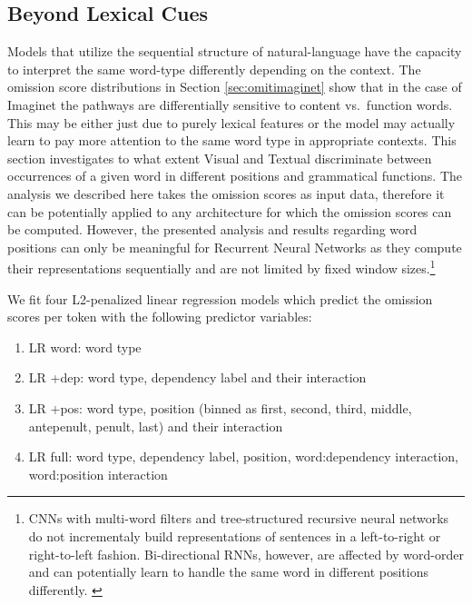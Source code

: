 

\subsection{Beyond Lexical Cues}
\label{sec:beyondlexical}

Models that utilize the sequential structure of natural-language 
have the capacity to interpret the same word-type differently depending on
the context. The omission score distributions in Section \ref{sec:omitimaginet} 
show that in the case of {\sc Imaginet} the 
pathways are differentially sensitive to content vs.\ function
words. This may be either just due to purely lexical features or the model 
may actually learn to pay more attention to the same word type in appropriate
contexts. This section investigates to what extent {\sc Visual} and {\sc Textual}
discriminate between occurrences of a given word in different positions and 
grammatical functions. The analysis we described here takes \label{edit:beyonlexicalgeneral}
the omission scores as input data, therefore it can be potentially applied 
to any architecture for which the omission scores can be computed. However,
the presented analysis and results regarding word positions can only be meaningful
for Recurrent Neural Networks as they compute their representations sequentially and are not
limited by fixed window sizes.\footnote{CNNs with multi-word filters
and tree-structured recursive neural networks do not incrementaly build representations
of sentences in a left-to-right or right-to-left fashion. 
Bi-directional RNNs, however, are affected by word-order and can potentially
learn to handle the same word in different positions differently. \label{edit:foot}}

We fit four L2-penalized linear regression models which predict the omission 
scores per token with the following predictor variables: 


\begin{enumerate}
	\item {\sc LR word}: word type
	\item {\sc LR +dep}: word type, dependency label and their interaction 
	\item {\sc LR +pos}: word type, position (binned as {\sc first, second, third, middle,
	antepenult, penult, last}) and their interaction
	\item {\sc LR full}: word type, dependency label, position, word:dependency interaction, 
	word:position interaction
\end{enumerate}

